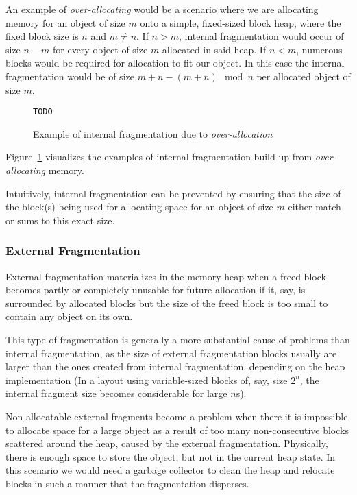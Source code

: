 An example of \textit{over-allocating} would be a scenario where we are allocating memory for an object of size $m$ onto a simple, fixed-sized block heap, where the fixed block size is $n$ and $m \neq n$. If $n > m$, internal fragmentation would occur of size $n-m$ for every object of size $m$ allocated in said heap. If $n < m$, numerous blocks would be required for allocation to fit our object. In this case the internal fragmentation would be of size $m + n - (m + n) \mod n$ per allocated object of size $m$. 

\begin{figure}[ht]
\centering
\texttt{TODO}
\caption{Example of internal fragmentation due to \textit{over-allocation}}
\label{fig:internal-frag-example}
\end{figure}

Figure~\ref{fig:internal-frag-example} visualizes the examples of internal fragmentation build-up from \textit{over-allocating} memory. 

Intuitively, internal fragmentation can be prevented by ensuring that the size of the block(s) being used for allocating space for an object of size $m$ either match or sums to this exact size.

\subsubsection{External Fragmentation}
External fragmentation materializes in the memory heap when a freed block becomes partly or completely unusable for future allocation if it, say, is surrounded by allocated blocks but the size of the freed block is too small to contain any object on its own.

This type of fragmentation is generally a more substantial cause of problems than internal fragmentation, as the size of external fragmentation blocks usually are larger than the ones created from internal fragmentation, depending on the heap implementation (In a layout using variable-sized blocks of, say, size $2^n$, the internal fragment size becomes considerable for large $n$s). 

Non-allocatable external fragments become a problem when there it is impossible to allocate space for a large object as a result of too many non-consecutive blocks scattered around the heap, caused by the external fragmentation. Physically, there is enough space to store the object, but not in the current heap state. In this scenario we would need a garbage collector to clean the heap and relocate blocks in such a manner that the fragmentation disperses.

